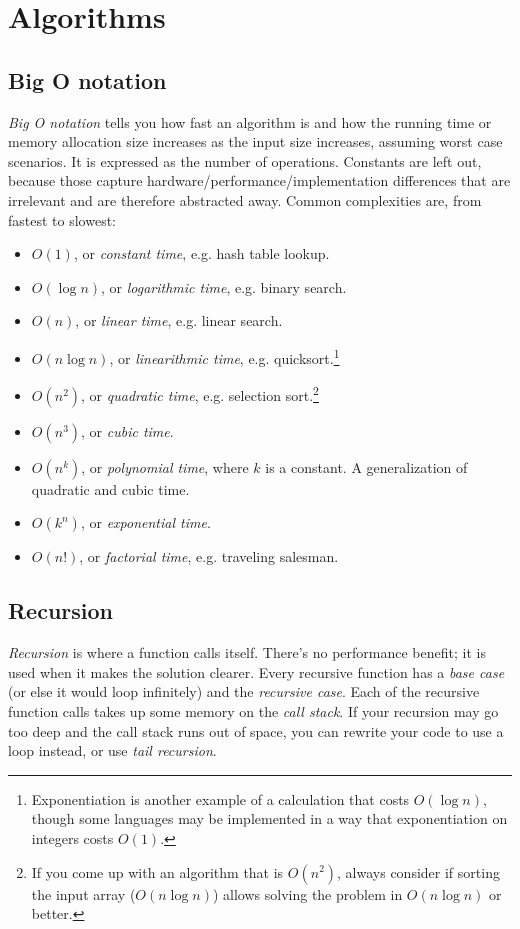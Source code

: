 \documentclass[8pt, table, xcdraw]{article}%
\begin{document}
\section{Algorithms}

\subsection{Big O notation}

\emph{Big O notation} tells you how fast an algorithm is and how the running time or memory allocation size increases as the input size increases, assuming worst case scenarios. It is expressed as the number of operations. Constants are left out, because those capture hardware/performance/implementation differences that are irrelevant and are therefore abstracted away. Common complexities are, from fastest to slowest:

\begin{itemize}
    \item $O(1)$, or \emph{constant time}, e.g. hash table lookup.
    \item $O(\log n)$, or \emph{logarithmic time}, e.g. binary search.
    \item $O(n)$, or \emph{linear time}, e.g. linear search.
    \item $O(n \log n)$, or \emph{linearithmic time}, e.g. quicksort.\footnote{Exponentiation is another example of a calculation that costs $O(\log n)$, though some languages may be implemented in a way that exponentiation on integers costs $O(1)$.}
    \item $O(n^2)$, or \emph{quadratic time}, e.g. selection sort.\footnote{If you come up with an algorithm that is $O(n^2)$, always consider if sorting the input array ($O(n \log n)$) allows solving the problem in $O(n \log n)$ or better.}
    \item $O(n^3)$, or \emph{cubic time}.
    \item $O(n^k)$, or \emph{polynomial time}, where $k$ is a constant. A generalization of quadratic and cubic time.
    \item $O(k^n)$, or \emph{exponential time}.
    \item $O(n!)$, or \emph{factorial time}, e.g. traveling salesman.
\end{itemize}

\subsection{Recursion}
\emph{Recursion} is where a function calls itself. There’s no performance benefit; it is used when it makes the solution clearer. Every recursive function has a \emph{base case} (or else it would loop infinitely) and the \emph{recursive case}. Each of the recursive function calls takes up some memory on the \emph{call stack}. If your recursion may go too deep and the call stack runs out of space, you can rewrite your code to use a loop instead, or use \emph{tail recursion}.
\end{document}
